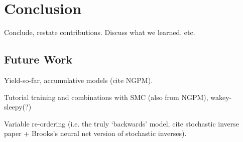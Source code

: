 \section{Conclusion}
\label{sec:conclusion}

Conclude, restate contributions. Discuss what we learned, etc.

\subsection{Future Work}
\label{sec:conclusion_futureWork}

Yield-so-far, accumulative models (cite NGPM).

Tutorial training and combinations with SMC (also from NGPM), wakey-sleepy(?)

Variable re-ordering (i.e. the truly `backwards' model, cite stochastic inverse paper + Brooks's neural net version of stochastic inverses).
